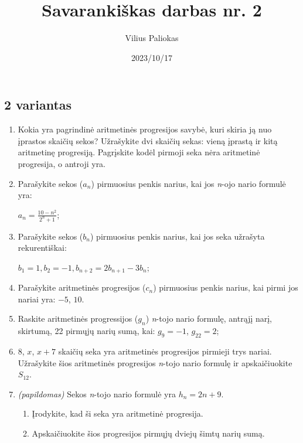 \documentclass[a4paper]{article}
\title{Savarankiškas darbas nr. 2}
\author{Vilius Paliokas}
\date{2023/10/17}
\begin{document}
\thispagestyle{fancy}

\subsection*{2 variantas}

\begin{enumerate}
      \item Kokia yra pagrindinė aritmetinės progresijos savybė, kuri skiria ją
            nuo įprastos skaičių sekos? Užrašykite dvi skaičių sekas: vieną
            įprastą ir kitą aritmetinę progresiją. Pagrįskite kodėl pirmoji
            seka nėra
            aritmetinė progresija, o antroji yra.

      \item Parašykite sekos ($a_{n}$) pirmuosius penkis
            narius, kai jos \textit{n}-ojo nario formulė yra:

            $a_{n}=\frac{10 - n^2}{2^{n} + 1}$;

      \item Parašykite sekos ($b_{n}$) pirmuosius penkis
            narius, kai jos seka užrašyta rekurentiškai:

            $b_1 = 1, b_{2} = -1, b_{n+2}=2b_{n+1}-3b_{n}$;

      \item Parašykite aritmetinės progresijos ($c_{n}$) pirmuosius penkis
            narius, kai pirmi jos nariai yra: $-5$, $10$.

      \item Raskite aritmetinės progressijos ($g_{n}$) \textit{n}-tojo nario
            formulę, antrąjį narį,
            skirtumą, 22 pirmųjų narių sumą, kai:
            $g_{9} = -1$, $g_{22}=2$;
      \item $ 8 $, $ x $, $ x+ 7$ skaičių seka yra aritmetinės progresijos
            pirmieji trys nariai. Užrašykite šios aritmetinės progresijos
            \textit{n}-tojo
            nario formulę ir apskaičiuokite $S_{12}$.

      \item \textit{(papildomas)} Sekos \textit{n}-tojo nario formulė yra $h_{n} = 2n+9$. 
      \begin{enumerate}[label= (\alph*)]
            \item Įrodykite, kad ši seka yra aritmetinė progresija.
            \item Apskaičiuokite šios progresijos pirmųjų dviejų šimtų narių sumą.
      \end{enumerate} 
\end{enumerate}
\end{document}
